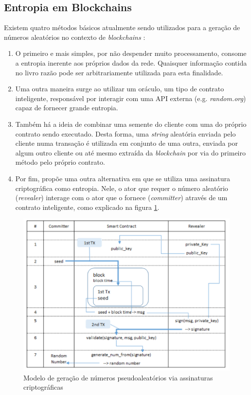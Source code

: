 \documentclass[a4paper,12pt]{monografia}
\theoremstyle{plain}
\theoremstyle{definition}
\theoremstyle{remark}
\begin{document}
\subsection{Entropia em Blockchains}
Existem quatro m\'{e}todos b\'{a}sicos atualmente sendo utilizados para a gera\c{c}\~{a}o de n\'{u}meros aleat\'{o}rios no contexto de \textit{blockchains} \cite{ethrandom}:
\begin{enumerate}
\item
O primeiro e mais simples, por n\~{a}o despender muito processamento, consome a entropia inerente aos pr\'{o}prios dados da rede.
Quaisquer informa\c{c}\~{a}o contida no livro raz\~{a}o pode ser arbitrariamente utilizada para esta finalidade.
\item
Uma outra maneira surge ao utilizar um or\'{a}culo, um tipo de contrato inteligente, respons\'{a}vel por interagir com uma API externa (e.g. \textit{random.org}) capaz de fornecer grande entropia.
\item
Tamb\'em h\'{a} a ideia de combinar uma semente do cliente com uma do pr\'{o}prio contrato sendo executado.
Desta forma, uma \textit{string} aleat\'{o}ria enviada pelo cliente numa transa\c{c}\~{a}o \'{e} utilizada em conjunto de uma outra, enviada por algum outro cliente ou at\'e mesmo extra\'{i}da da \textit{blockchain} por via do primeiro m\'{e}todo pelo pr\'{o}prio contrato.
\item
Por fim,  prop\~oe uma outra alternativa em que se utiliza uma assinatura criptogr\'afica como entropia.
Nele, o ator que requer o n\'umero aleat\'orio (\textit{revealer}) interage com o ator que o fornece (\textit{committer}) atrav\'es de um contrato inteligente, como explicado na figura \ref{fig:neowiz}.
\end{enumerate}

\begin{figure}[ht]
 \begin{center}
   \includegraphics[width=120mm,scale=1.0]{./figs/neowiz.png}
   \caption[Modelo de PRNG em \textit{blockchains} via assinaturas]{Modelo de gera\c{c}\~ao de n\'umeros pseudoaleat\'orios via assinaturas criptogr\'aficas \cite{neowiz}}
   \label{fig:neowiz}
 \end{center}
\end{figure}
\end{document}
